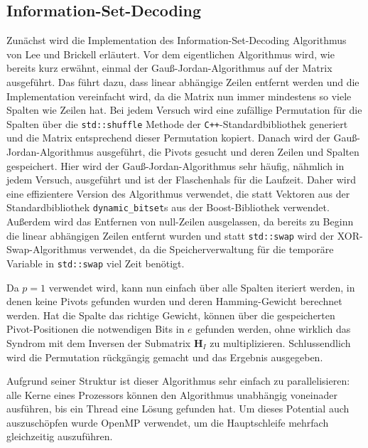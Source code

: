 \documentclass[a4paper,10pt,ngerman]{scrartcl}
\begin{document}
\subsection{Information-Set-Decoding}
Zunächst wird die Implementation des Information-Set-Decoding Algorithmus von Lee und Brickell erläutert.
Vor dem eigentlichen Algorithmus wird, wie bereits kurz erwähnt, einmal der Gauß-Jordan-Algorithmus auf der Matrix ausgeführt. 
Das führt dazu, dass linear abhängige Zeilen entfernt werden und die Implementation vereinfacht wird, da die Matrix nun immer mindestens so viele Spalten wie Zeilen hat.
Bei jedem Versuch wird eine zufällige Permutation für die Spalten über die \lstinline{std::shuffle} Methode der \texttt{C++}-Standardbibliothek generiert und die Matrix entsprechend dieser Permutation kopiert. 
Danach wird der Gauß-Jordan-Algorithmus ausgeführt, die Pivots gesucht und deren Zeilen und Spalten gespeichert. 
Hier wird der Gauß-Jordan-Algorithmus sehr häufig, nähmlich in jedem Versuch, ausgeführt und ist der Flaschenhals für die Laufzeit. 
Daher wird eine effizientere Version des Algorithmus verwendet, die statt Vektoren aus der Standardbibliothek \lstinline{dynamic_bitset}s aus der Boost-Bibliothek verwendet.
Außerdem wird das Entfernen von null-Zeilen ausgelassen, da bereits zu Beginn die linear abhängigen Zeilen entfernt wurden und statt \lstinline{std::swap} wird der XOR-Swap-Algorithmus verwendet, da die Speicherverwaltung für die temporäre Variable in \lstinline{std::swap} viel Zeit benötigt.

Da $p=1$ verwendet wird, kann nun einfach über alle Spalten iteriert werden, in denen keine Pivots gefunden wurden und deren Hamming-Gewicht berechnet werden. 
Hat die Spalte das richtige Gewicht, können über die gespeicherten Pivot-Positionen die notwendigen Bits in $e$ gefunden werden, ohne wirklich das Syndrom mit dem Inversen der Submatrix $\mathbf{H}_I$ zu multiplizieren.
Schlussendlich wird die Permutation rückgängig gemacht und das Ergebnis ausgegeben. 

Aufgrund seiner Struktur ist dieser Algorithmus sehr einfach zu parallelisieren: alle Kerne eines Prozessors können den Algorithmus unabhängig voneinader ausführen, bis ein Thread eine Lösung gefunden hat.
Um dieses Potential auch auszuschöpfen wurde OpenMP verwendet, um die Hauptschleife mehrfach gleichzeitig auszuführen.
\end{document}
